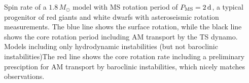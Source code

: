  \label{fig:MRI1p8rot} Spin rate of a $1.8 \, M_\odot$ model with MS rotation period of $P_{\rm MS} = 2 \, {\rm d}$, a typical progenitor of red giants and white dwarfs with asteroseismic rotation measurements. The blue line shows the surface rotation, while the black line shows the core rotation period including AM transport by the TS dynamo. Models including only hydrodynamic instabilities (but not baroclinic instabilities)The red line shows the core rotation rate including a preliminary presciption for AM transport by baroclinic instabilities, which nicely matches observations.